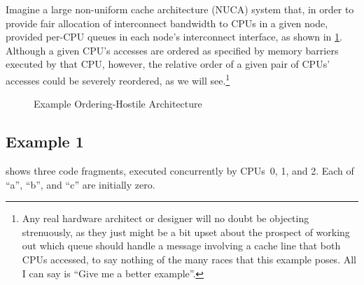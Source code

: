 \QuickQuizEnd

Imagine a large non-uniform cache architecture (NUCA) system that,
in order to provide fair allocation
of interconnect bandwidth to CPUs in a given node, provided per-CPU
queues in each node's interconnect interface, as shown in
\cref{fig:app:whymb:Example Ordering-Hostile Architecture}.
Although a given CPU's accesses are ordered as specified by memory
barriers executed by that CPU, however, the relative order of a
given pair of CPUs' accesses could be severely reordered,
as we will see.\footnote{
	Any real hardware architect or designer will no doubt be
	objecting strenuously,
	as they just might be a bit upset about the prospect of working
	out which queue should handle a message involving a cache line
	that both CPUs accessed, to say nothing of the many races that
	this example poses.
	All I can say is ``Give me a better example''.}

\begin{figure}
\centering
{}
\caption{Example Ordering-Hostile Architecture}
\label{fig:app:whymb:Example Ordering-Hostile Architecture}
\end{figure}

\subsection{Example 1}
\label{sec:app:whymb:Example 1}

shows three code fragments, executed concurrently by CPUs~0, 1, and 2.
Each of ``a'', ``b'', and ``c'' are initially zero.


